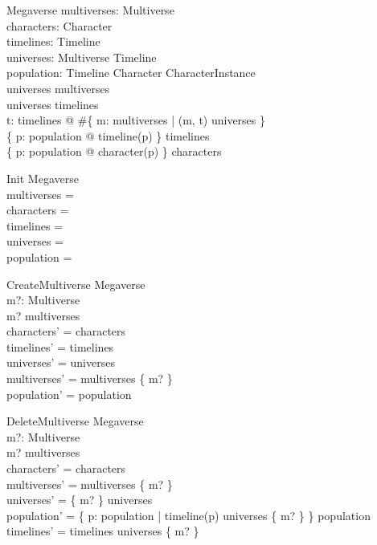\documentclass{article}
\begin{document}
\begin{schema}{Megaverse}
multiverses: \power Multiverse \\
characters: \power Character \\
timelines: \power Timeline \\ 
universes: Multiverse \rel Timeline \\
population: Timeline \cross Character \pfun CharacterInstance \\
\where
\dom universes \subseteq multiverses \\ 
\ran universes \subseteq timelines \\ 
\forall t: timelines @ \#\{ m: multiverses | (m, t) \in universes \}  \\
\{ p: \dom population @ timeline(p) \} \subseteq timelines \\
\{ p: \dom population @ character(p) \} \subseteq characters \\
\end{schema}

\begin{schema}{Init}
Megaverse \\ 
\where
multiverses = \emptyset \\
characters = \emptyset \\ 
timelines = \emptyset \\
universes = \emptyset \\
population = \emptyset \\
\end{schema}

\begin{schema}{CreateMultiverse}
\Delta Megaverse \\
m?: Multiverse \\
\where
m? \notin multiverses \\
characters' = characters \\
timelines' = timelines \\
universes' = universes \\
multiverses' = multiverses \cup \{ m? \} \\ 
population' = population \\
\end{schema}

\begin{schema}{DeleteMultiverse}
\Delta Megaverse \\
m?: Multiverse \\
\where
m? \in multiverses \\
characters' = characters \\
multiverses' = multiverses \setminus \{ m? \} \\
universes' = \{ m? \} \ndres universes \\
population' = \{ p: \dom population | timeline(p) \in universes \limg \{ m? \} \rimg \} \ndres population \\
timelines' = timelines \setminus universes \limg \{ m? \} \rimg   \\
\end{schema} 
\end{document}

